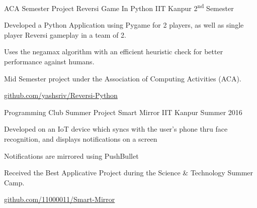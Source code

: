 

\begin{cventries}

  \cventry
  {ACA Semester Project} %
  {Reversi Game In Python} %
  {IIT Kanpur} %
  {2\textsuperscript{nd} Semester} %
  {
    \begin{cvitems} %
    \item {Developed a Python Application using Pygame for 2 players, as well
        as single player Reversi gameplay in a team of 2.}
    \item {Uses the negamax algorithm with an efficient heuristic check
        for better performance against humans.}
    \item{Mid Semester project under the Association of Computing
        Activities (ACA).}
    \item \href{https://github.com/yashsriv/Reversi-Python}{github.com/yashsriv/Reversi-Python}
    \end{cvitems}
  }

  \cventry
  {Programming Club Summer Project} %
  {Smart Mirror} %
  {IIT Kanpur} %
  {Summer 2016} %
  {
    \begin{cvitems} %
    \item {Developed on an IoT device which syncs with the user's phone thru face
        recognition, and displays notifications on a screen }
    \item {Notifications are mirrored using PushBullet}
    \item {Received the Best Applicative Project during the Science \&
        Technology Summer Camp.}
    \item \href{https://github.com/11000011/Smart-Mirror}{github.com/11000011/Smart-Mirror}
    \end{cvitems}
  }

\end{cventries}

